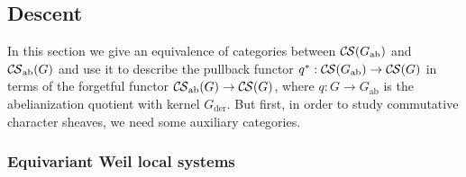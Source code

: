 \documentclass[10pt]{amsart}
\theoremstyle{plain}
\theoremstyle{definition}
\newcommand{\der}{_{\operatorname{der}}}
\newcommand{\ab}{_{\operatorname{ab}}}
\newcommand{\CS}{{\mathcal{C\hskip-0.8pt S}}}
\begin{document}
\subsection{Descent}\label{ssec:descent}

In this section we give an equivalence of categories between $\CS(G\ab)$ and $\CS\ab(G)$ and use it to describe
the pullback functor $q^* : \CS(G\ab) \to \CS(G)$ in terms of the forgetful functor $\CS\ab(G) \to \CS(G)$, where $q : G\to G\ab$ is the abelianization quotient with kernel $G\der$.
But first, in order to study commutative character sheaves, we need some auxiliary categories.

\subsubsection{Equivariant Weil local systems}\label{ssec:equivariant1}
\end{document}

